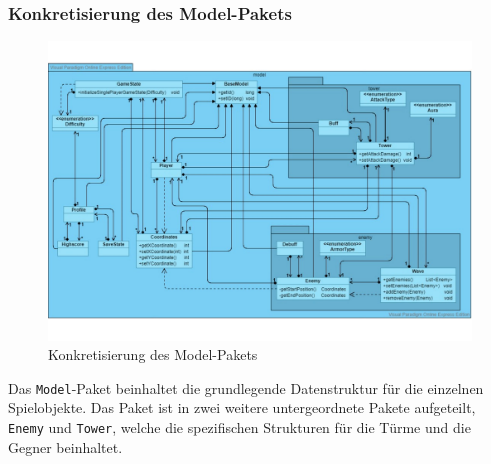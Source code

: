 \documentclass[enabledeprecatedfontcommands,fontsize=12pt,paper=a4,twoside,parskip=half]{scrartcl}
\begin{document}
\subsubsection{Konkretisierung des Model-Pakets}

\begin{figure}[H]
    \centering
    \includegraphics[width=\textwidth]{Bilder/KlassendiagramModel.pdf}
    \caption{Konkretisierung des Model-Pakets}
    \label{fig:modPak}
\end{figure}

Das \texttt{Model}-Paket beinhaltet die grundlegende Datenstruktur für die einzelnen Spielobjekte.
Das Paket ist in zwei weitere untergeordnete Pakete aufgeteilt, \texttt{Enemy} und \texttt{Tower}, welche die spezifischen Strukturen für die Türme und die Gegner beinhaltet.
\end{document}

